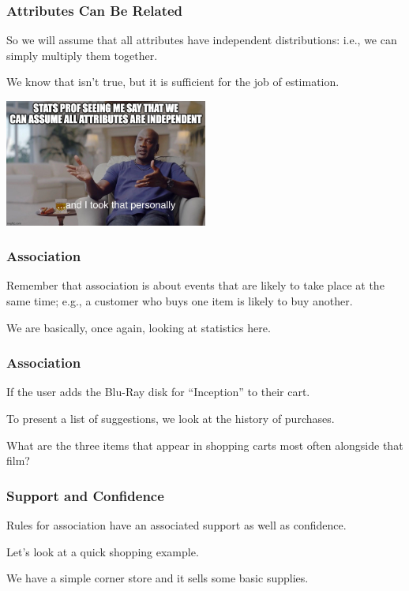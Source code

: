 \begin{frame}
\frametitle{Attributes Can Be Related}

So we will assume that all attributes have independent distributions: i.e., we can simply multiply them together. 

We know that isn't true, but it is sufficient for the job of estimation. 

\begin{center}
	\includegraphics[width=0.5\textwidth]{images/personally.jpg}
\end{center}

\end{frame}

\begin{frame}
\frametitle{Association}

Remember that association is about events that are likely to take place at the same time; e.g., a customer who buys one item is likely to buy another. 

We are basically, once again, looking at statistics here. 

\end{frame}

\begin{frame}
\frametitle{Association}

If the user adds the Blu-Ray disk for ``Inception'' to their cart. 

To present a list of suggestions, we look at the history of purchases. 

What are the three items that appear in shopping carts most often alongside that film?

\end{frame}

\begin{frame}
\frametitle{Support and Confidence}

Rules for association have an associated \alert{support} as well as \alert{confidence}. 

Let's look at a quick shopping example. 

We have a simple corner store and it sells some basic supplies.

\end{frame}

